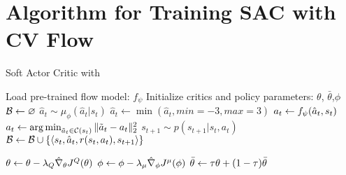 
\newpage
\section{Algorithm for Training SAC with CV Flow}\label{sup:fine_tune}
\begin{algorithm}[ht]
\caption{Soft Actor Critic with \our}
\label{alg:soft_actor_critic}
\begin{algorithmic}[1]
\STATE Load pre-trained flow model: $f_\psi$
\STATE Initialize critics and policy parameters: $\theta$, $\bar{\theta}$,$\phi$
\STATE $\mathcal{B} \leftarrow \varnothing$ 
	\STATE $\hat{a}_t \sim \mu_\phi(\hat{a}_t|s_t)$ 
	\STATE $\hat{a}_t \leftarrow  \min(\hat{a}_t, min=-3, max=3)$ 
        \STATE $a_t \leftarrow f_\psi(\hat{a}_t,s_t)$ 
            \STATE $a_t \leftarrow \operatorname*{arg\,min}_{\tilde{a}_t \in \mathcal{C}(s_t)} \|\tilde{a}_t - a_t\|^2_2$ 
        \ENDIF
	\STATE $s_{t+1} \sim p(s_{t+1}| s_t, a_t)$ 
	\STATE $\mathcal{B} \leftarrow \mathcal{B} \cup \left\{\langle s_t, \hat{a}_t, r(s_t, a_t), s_{t+1}\rangle\right\}$
	\ENDFOR
 
        \STATE $\theta \leftarrow \theta - \lambda_Q \hat\nabla_\theta J^Q(\theta)$ 
        \STATE $\phi \leftarrow \phi - \lambda_\mu \hat\nabla_\phi J^\mu(\phi)$ 
        \STATE $\bar{\theta} \leftarrow \tau \theta + (1-\tau){\bar{\theta}} $ 
	\ENDFOR
\ENDFOR
\end{algorithmic}
\end{algorithm}

